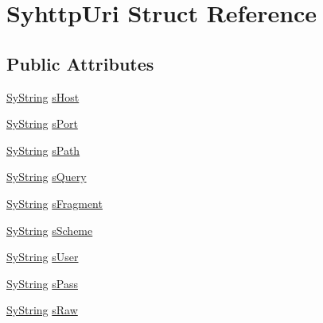 \hypertarget{struct_syhttp_uri}{\section{Syhttp\-Uri Struct Reference}
\label{d3/d21/struct_syhttp_uri}
}
\subsection*{Public Attributes}
\begin{DoxyCompactItemize}
\item 
\hyperlink{struct_sy_string}{Sy\-String} \hyperlink{struct_syhttp_uri_abaf0be88b104fda8975080f3d4cc6680}{s\-Host}
\item 
\hyperlink{struct_sy_string}{Sy\-String} \hyperlink{struct_syhttp_uri_a1d2d2fbc22c31a060029e514f3de4e3f}{s\-Port}
\item 
\hyperlink{struct_sy_string}{Sy\-String} \hyperlink{struct_syhttp_uri_ac278bb9a38b2e39ac3135d05be4ef3bb}{s\-Path}
\item 
\hyperlink{struct_sy_string}{Sy\-String} \hyperlink{struct_syhttp_uri_af8de634c60754384545187b454f0a8cd}{s\-Query}
\item 
\hyperlink{struct_sy_string}{Sy\-String} \hyperlink{struct_syhttp_uri_a57c8361609909d760adc0e6b99043a5c}{s\-Fragment}
\item 
\hyperlink{struct_sy_string}{Sy\-String} \hyperlink{struct_syhttp_uri_a4cf1798c5ca5f2a4469ecedf081d4f78}{s\-Scheme}
\item 
\hyperlink{struct_sy_string}{Sy\-String} \hyperlink{struct_syhttp_uri_ae3a640b7a59d8dbcfd8d7da703f53b55}{s\-User}
\item 
\hyperlink{struct_sy_string}{Sy\-String} \hyperlink{struct_syhttp_uri_a632c7b46d941681bebb5f5252c5deeba}{s\-Pass}
\item 
\hyperlink{struct_sy_string}{Sy\-String} \hyperlink{struct_syhttp_uri_a14b546650bec9c4d7a38fe2974d66b1c}{s\-Raw}
\end{DoxyCompactItemize}


